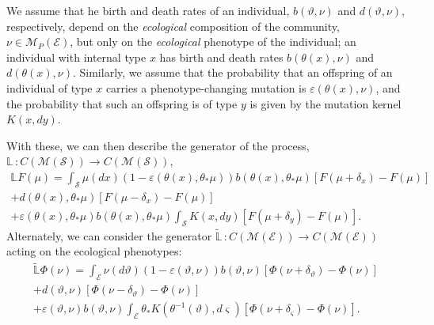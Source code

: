 \documentclass[11pt]{amsart}
\theoremstyle{remark}
\theoremstyle{definition}
\begin{document}

We assume that he birth and death rates of an individual, $b(\vartheta,\nu)$ and $d(\vartheta,\nu)$, respectively, depend on the \emph{ecological} composition of the community, $\nu \in \mathcal{M}_{P}(\mathcal{E})$, but only on the \emph{ecological} phenotype of the individual; an individual with internal type $x$ has birth and death rates $b(\theta(x),\nu)$ and $d(\theta(x),\nu)$.  Similarly, we assume that the probability that an offspring of an individual of type $x$ carries a phenotype-changing mutation is $\varepsilon(\theta(x),\nu)$, and the probability that such an offspring is of type $y$ is given by the mutation kernel $K(x,dy)$. 

With these, we can then describe the generator of the process, $\mathbb{L}\,\colon C(\mathcal{M}(\mathcal{S})) \longrightarrow C(\mathcal{M}(\mathcal{S}))$,
\begin{multline}\label{GENI}
	\mathbb{L}F(\mu) = \int_{\mathcal{S}} \mu(dx) (1-\varepsilon(\theta(x),\theta_{*}\mu)) b(\theta(x),\theta_{*}\mu)[F(\mu+\delta_{x})-F(\mu)]\\
	+ d(\theta(x),\theta_{*}\mu)[F(\mu-\delta_{x})-F(\mu)]\\
	+ \varepsilon(\theta(x),\theta_{*}\mu) b(\theta(x),\theta_{*}\mu)\int_{\mathcal{S}} K(x,dy)[F(\mu+\delta_{y})-F(\mu)].
\end{multline}
Alternately, we can consider the generator $\tilde{\mathbb{L}}\,\colon C(\mathcal{M}(\mathcal{E})) \longrightarrow C(\mathcal{M}(\mathcal{E}))$ acting on the ecological phenotypes: 
\begin{multline}\label{GENE}
	\tilde{\mathbb{L}}\Phi(\nu)
	 = \int_{\mathcal{E}} \nu(d\vartheta) (1-\varepsilon(\vartheta,\nu)) b(\vartheta,\nu)[\Phi(\nu+\delta_{\vartheta})-\Phi(\nu)]\\
	+ d(\vartheta,\nu)[\Phi(\nu-\delta_{\vartheta})-\Phi(\nu)]\\
	+ \varepsilon(\vartheta,\nu) b(\vartheta,\nu)
		\int_{\mathcal{E}} \theta_{*}K(\theta^{-1}(\vartheta),d\varsigma)[\Phi(\nu+\delta_{\varsigma})-\Phi(\nu)].
\end{multline}
	
\end{document}
